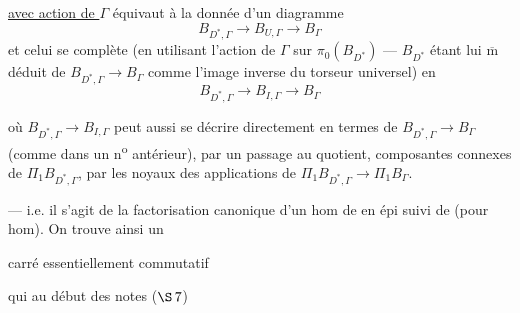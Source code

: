 
\uline{avec action de $\Gamma$} équivaut à la donnée
d'un diagramme
\[
 B_{D^*,\Gamma}\longrightarrow B_{U,\Gamma}\longrightarrow B_\Gamma
\]
et celui se complète (en utilisant
l'action de $\Gamma$ sur $\pi_0(B_{D^*})$ ---
$B_{D^*}$ étant lui $\overline{\mathrm m}$ déduit de $B_{D^*,\Gamma}\longrightarrow B_\Gamma$
comme l'image inverse du torseur
universel)  en
\[
 B_{D^*,\Gamma}\longrightarrow B_{I,\Gamma}\longrightarrow B_\Gamma
\]

 où $B_{D^*,\Gamma}\longrightarrow B_{I,\Gamma}$ peut aussi se
décrire directement en termes de
$B_{D^*,\Gamma}\longrightarrow B_\Gamma$ (comme dans un n\textsuperscript{o}
antérieur), 
par un passage au
quotient,  composantes connexes
de $\Pi_1 B_{D^*,\Gamma}$, par les noyaux des applications
 de $\Pi_1 B_{D^*,\Gamma}\longrightarrow\Pi_1 B_\Gamma$.

--- i.e. il s'agit de la factorisation
canonique d'un hom de 
en \unsure{(} épi
 \unsure{)} suivi de 
(pour hom). On trouve ainsi un


carré essentiellement commutatif

qui 
au début des notes  ($\S\,7$)

